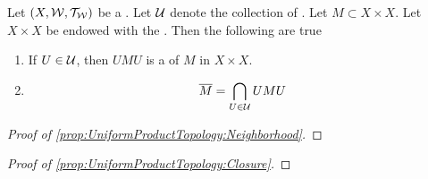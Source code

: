 \begin{prop}
\label{prop:UniformProductTopology}
Let $(X,\mathcal{W}, \mathcal{T}_{\mathcal{W}})$ be a \UniformSpace. 
Let $\mathcal{U}$ denote the collection of \SymmetricRelation \Entourages.
Let $M \subset X \times X$. 
Let $X \times X$ be endowed with the \ProductTopology.
Then the following are true
\begin{enumerate}[label=(\roman*), ref={\ref{prop:UniformProductTOpology}~\roman*}]
\item \label{prop:UniformProductTopology:Neighborhood} If $U \in \mathcal{U}$, then $UMU$ is a \Neighborhood of $M$ in $X \times X$. 
\item \label{prop:UniformProductTopology:Closure} 
\begin{equation*}
\overline{M} = \bigcap_{U \in \mathcal{U}} U M U
\end{equation*}
\end{enumerate}
\begin{proof}[Proof of \ref{prop:UniformProductTopology:Neighborhood}]
\end{proof}
\begin{proof}[Proof of \ref{prop:UniformProductTopology:Closure}]
\end{proof}
\end{prop}

